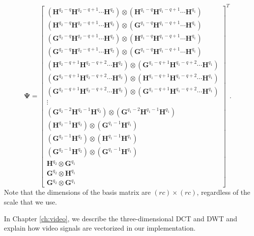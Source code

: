 \begin{equation*}
\label{eqn:haar2_fullbasis}
  \bm \Psi = 
  \begin{bmatrix}
    (\bm H^{q_2-q}\bm H^{q_2-q+1} \cdots \bm H^{q_2}) \otimes (\bm H^{q_1-q} \bm H^{q_1-q+1}\cdots\bm H^{q_1}) \\
    (\bm H^{q_2-q}\bm H^{q_2-q+1} \cdots \bm H^{q_2}) \otimes (\bm G^{q_1-q} \bm H^{q_1-q+1}\cdots\bm H^{q_1}) \\
    (\bm G^{q_2-q}\bm H^{q_2-q+1} \cdots \bm H^{q_2}) \otimes (\bm H^{q_1-q} \bm H^{q_1-q+1}\cdots\bm H^{q_1}) \\
    (\bm G^{q_2-q}\bm H^{q_2-q+1} \cdots \bm H^{q_2}) \otimes (\bm G^{q_1-q} \bm H^{q_1-q+1}\cdots\bm H^{q_1}) \\
    (\bm H^{q_2-q+1}\bm H^{q_2-q+2} \cdots \bm H^{q_2}) \otimes (\bm G^{q_1-q+1} \bm H^{q_1-q+2}\cdots\bm H^{q_1}) \\
    (\bm G^{q_2-q+1}\bm H^{q_2-q+2} \cdots \bm H^{q_2}) \otimes (\bm H^{q_1-q+1} \bm H^{q_1-q+2}\cdots\bm H^{q_1}) \\
    (\bm G^{q_2-q+1}\bm H^{q_2-q+2} \cdots \bm H^{q_2}) \otimes (\bm G^{q_1-q+1} \bm H^{q_1-q+2}\cdots\bm H^{q_1}) \\
    \vdots \\
    (\bm G^{q_2-2}\bm H^{q_2-1} \bm H^{q_2}) \otimes (\bm G^{q_1-2}\bm H^{q_1-1}\bm H^{q_1}) \\
    (\bm H^{q_2-1} \bm H^{q_2}) \otimes (\bm G^{q_1-1}\bm H^{q_1}) \\
    (\bm G^{q_2-1} \bm H^{q_2}) \otimes (\bm H^{q_1-1}\bm H^{q_1}) \\
    (\bm G^{q_2-1} \bm H^{q_2}) \otimes (\bm G^{q_1-1}\bm H^{q_1}) \\
    \bm H^{q_2} \otimes \bm G^{q_1} \\
    \bm G^{q_2} \otimes \bm H^{q_1} \\
    \bm G^{q_2} \otimes \bm G^{q_1} 
  \end{bmatrix}^T.
\end{equation*}
Note that the dimensions of the basis matrix are $(rc)\times (rc)$, regardless of the scale that we use.

In Chapter \ref{ch:video}, we describe the three-dimensional DCT and DWT and explain how video signals are vectorized in our implementation.
